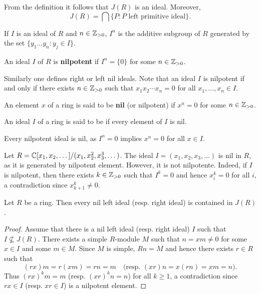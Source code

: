 From the definition it follows
that $J(R)$ is an ideal. Moreover, 
	\[
		J(R)=\bigcap\{P:\text{$P$ left primitive ideal}\}.
	\]

	If $I$ is an ideal of $R$ and $n\in\mathbb{Z}_{>0}$, $I^n$ is the additive subgroup of $R$ 
generated by the set $\{y_1\dots y_n:y_j\in I\}$. 

\begin{definition}
An ideal $I$ of $R$ is \textbf{nilpotent} 
if $I^n=\{0\}$ for some $n\in\mathbb{Z}_{>0}$.
\end{definition}

Similarly one defines right or left nil ideals. 
Note that an ideal $I$ is nilpotent if and only if there exists $n\in\mathbb{Z}_{>0}$ such that 
$x_1x_2\cdots x_n=0$ for all $x_1,\dots,x_n\in I$.  

\begin{definition}
	An element $x$ of a ring is said to be \textbf{nil} (or nilpotent) if $x^n=0$ for some $n\in\mathbb{Z}_{>0}$. 
\end{definition}

\begin{definition}
An ideal $I$ of a ring is said to be  if every element of $I$ is nil. 
\end{definition}

Every nilpotent ideal is nil, as $I^n=0$ implies $x^n=0$ for all 
$x\in I$.

\begin{example}
	Let $R=\mathbb{C}[x_1,x_2,\dots]/(x_1,x_2^2,x_3^3,\dots)$. The ideal 
	$I=(x_1,x_2,x_3,\dots)$ is nil in $R$, as it is generated by nilpotent element. However, it is not nilpotente. Indeed, if $I$ is nilpotent, then there exists $k\in\mathbb{Z}_{>0}$ such that 
	$I^k=0$ and hence $x_i^k=0$ for all $i$, a contradiction since 
	$x_{k+1}^k\ne0$. 	
\end{example}

\begin{proposition}
	\label{pro:nilJ}
	Let $R$ be a ring. Then every nil left ideal (resp. right ideal) is contained in $J(R)$.
\end{proposition}

\begin{proof}
	Assume that there is a nil left ideal (resp. right ideal) $I$ such that 
	$I\not\subseteq J(R)$. There exists a simple $R$-module $M$ such that 
	$n=xm\ne 0$ for some $x\in I$ and some $m\in M$. Since $M$ is simple,
	$Rn=M$ and hence there exists $r\in R$ such that 
	\[
	(rx)m=r(xm)=rn=m\quad\text{(resp.
	$(xr)n=x(rn)=xm=n$).}
	\]
	Thus $(rx)^km=m$ (resp. $(xr)^kn=n$) for all 
	$k\geq1$, a contradiction since $rx\in I$ (resp. $xr\in I$) is a nilpotent element. 
\end{proof}

